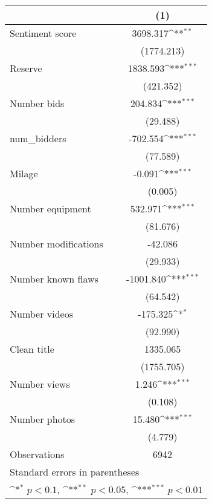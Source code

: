 {
\def\sym#1{\ifmmode^{#1}\else\(^{#1}\)\fi}
\begin{tabular}{l*{1}{c}}
\hline\hline
                    &\multicolumn{1}{c}{(1)}         \\
\hline
Sentiment score     &    3698.317\sym{**} \\
                    &  (1774.213)         \\
[1em]
Reserve             &    1838.593\sym{***}\\
                    &   (421.352)         \\
[1em]
Number bids         &     204.834\sym{***}\\
                    &    (29.488)         \\
[1em]
num\_bidders         &    -702.554\sym{***}\\
                    &    (77.589)         \\
[1em]
Milage              &      -0.091\sym{***}\\
                    &     (0.005)         \\
[1em]
Number equipment    &     532.971\sym{***}\\
                    &    (81.676)         \\
[1em]
Number modifications&     -42.086         \\
                    &    (29.933)         \\
[1em]
Number known flaws  &   -1001.840\sym{***}\\
                    &    (64.542)         \\
[1em]
Number videos       &    -175.325\sym{*}  \\
                    &    (92.990)         \\
[1em]
Clean title         &    1335.065         \\
                    &  (1755.705)         \\
[1em]
Number views        &       1.246\sym{***}\\
                    &     (0.108)         \\
[1em]
Number photos       &      15.480\sym{***}\\
                    &     (4.779)         \\
\hline
Observations        &        6942         \\
\hline\hline
\multicolumn{2}{l}{\footnotesize Standard errors in parentheses}\\
\multicolumn{2}{l}{\footnotesize \sym{*} \(p<0.1\), \sym{**} \(p<0.05\), \sym{***} \(p<0.01\)}\\
\end{tabular}
}
